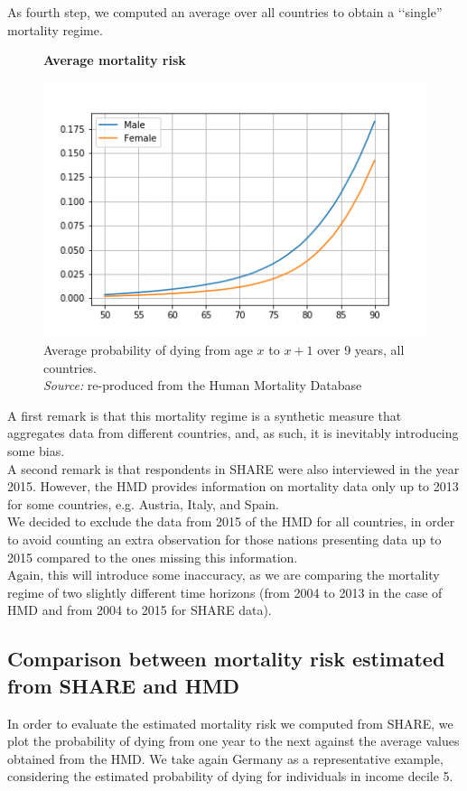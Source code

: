 As fourth step, we computed an average over all countries to obtain a \lq\lq single'' mortality regime.   

\begin{figure}[H]
    \centering \textbf{Average mortality risk}\par\medskip
        \centering
        \includegraphics[scale=.5]{images/Average_mortality_all_countries.png}
          \captionsetup{justification=centering}
    \caption{Average probability of dying from age $x$ to $x+1$   over 9 years, all countries. \\ \textit{Source:} re-produced from the Human Mortality Database }
    \label{fig:averages_1}
\end{figure}

A first remark is that this mortality regime is a synthetic measure that aggregates data from different countries, and, as such, it is inevitably introducing some bias. \\
A second remark is that respondents in SHARE were also interviewed in the year 2015. However, the HMD provides information on mortality data only up to 2013 for some countries, e.g. Austria, Italy, and Spain.\\
We decided to exclude the data from 2015 of the HMD for all countries, in order to avoid counting an extra observation for those nations presenting data up to 2015 compared to the ones missing this information.\\
Again, this will introduce some inaccuracy, as we are comparing the mortality regime of two slightly different time horizons (from 2004 to 2013 in the case of HMD and from 2004 to 2015 for SHARE data). 



\subsection{Comparison between mortality risk estimated from SHARE and HMD}
In order to evaluate the estimated mortality risk we computed from SHARE, we plot the probability of dying from one year to the next against the average values obtained from the HMD. We take again Germany as a representative example, considering the estimated probability of dying for individuals in income decile 5.\\


